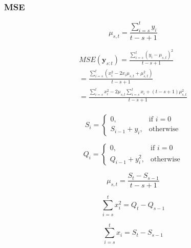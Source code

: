 \subsubsection{MSE}

\begin{equation}
    \mu_{s, t} = \frac{\sum \limits_{i = s}^{t} y_{i}}{t - s + 1}
\end{equation}

\begin{equation}
    \begin{aligned}
        MSE(\mathbf{y}_{s : t}) = \frac{\sum \limits_{i = s}^{t} (y_{i} - \mu_{s, t})^{2}}{t - s + 1} \\
        = \frac{\sum \limits_{i = s}^{t} (x_{i}^{2} - 2 x_{i} \mu_{s, t} + \mu_{s, t}^{2})}{t - s + 1} \\
        = \frac{\sum \limits_{i = s}^{t} x_{i}^{2} - 2 \mu_{s, t} \sum \limits_{i = s}^{t} x_{i} + (t - s + 1) \mu_{s, t}^{2}}{t - s + 1} \\
    \end{aligned}
\end{equation}

\begin{equation}
    S_{i} = 
    \begin{cases}
        0, & \text{if } i = 0 \\
        S_{i - 1} + y_{i}, & \text{otherwise}
    \end{cases}
\end{equation}

\begin{equation}
    Q_{i} = 
    \begin{cases}
        0, & \text{if } i = 0 \\
        Q_{i - 1} + y_{i}^{2}, & \text{otherwise}
    \end{cases}
\end{equation}

\begin{equation}
    \mu_{s, t} = \frac{S_{t} - S_{s - 1}}{t - s + 1}
\end{equation}

\begin{equation}
    \sum \limits_{i = s}^{t} x_{i}^{2} = Q_{t} - Q_{s - 1}
\end{equation}

\begin{equation}
    \sum \limits_{i = s}^{t} x_{i} = S_{t} - S_{s - 1}
\end{equation}

